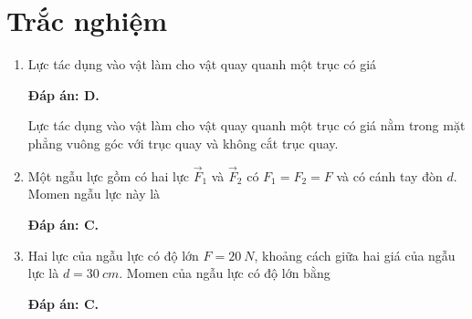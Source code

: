 \section{Trắc nghiệm}
\begin{enumerate}[label=\bfseries Câu \arabic*:]
	
	\item {}
	
	
	{Lực tác dụng vào vật làm cho vật quay quanh một trục có giá
	}
	
	\hideall
	{	\textbf{Đáp án: D.}
		
		Lực tác dụng vào vật làm cho vật quay quanh một trục có giá nằm trong mặt phẳng vuông góc với trục quay và không cắt trục quay.
	}
		\item {}
	
	
	{Một ngẫu lực gồm có hai lực $\vec F_1$ và $\vec F_2$ có $F_1 = F_2 = F$ và có cánh tay đòn $d$. Momen ngẫu lực này là
	}
	
	\hideall
	{	\textbf{Đáp án: C.}
		
	}
		\item {}
	
	
	{Hai lực của ngẫu lực có độ lớn $F=\SI{20}{N}$, khoảng cách giữa hai giá của ngẫu lực là $d=\SI{30}{cm}$. Momen của ngẫu lực có độ lớn bằng
	}
	
	\hideall
	{	\textbf{Đáp án: C.}
		
}
\end{enumerate}
